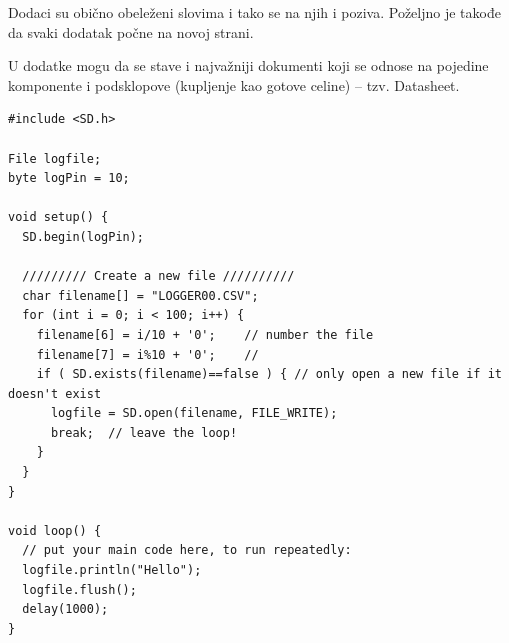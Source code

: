 \documentclass[a4paper, 12pt]{article}
\begin{document}
\vspace{10pt}


Dodaci su obično obeleženi slovima i tako se na njih i poziva. Poželjno je takođe da svaki dodatak počne na novoj strani.

\vspace{10pt}

U dodatke mogu da se stave i najvažniji dokumenti koji se odnose na pojedine komponente i podsklopove (kupljenje kao gotove celine) – tzv. Datasheet. 

\vspace{10pt}

\begin{lstlisting}[style=Arduino]
#include <SD.h>

File logfile;
byte logPin = 10;

void setup() {
  SD.begin(logPin);

  ///////// Create a new file //////////
  char filename[] = "LOGGER00.CSV";
  for (int i = 0; i < 100; i++) {
    filename[6] = i/10 + '0';    // number the file
    filename[7] = i%10 + '0';    //
    if ( SD.exists(filename)==false ) { // only open a new file if it doesn't exist
      logfile = SD.open(filename, FILE_WRITE);
      break;  // leave the loop!
    }
  }
}

void loop() {
  // put your main code here, to run repeatedly:
  logfile.println("Hello");
  logfile.flush();
  delay(1000);
}
\end{lstlisting}
\end{document}
